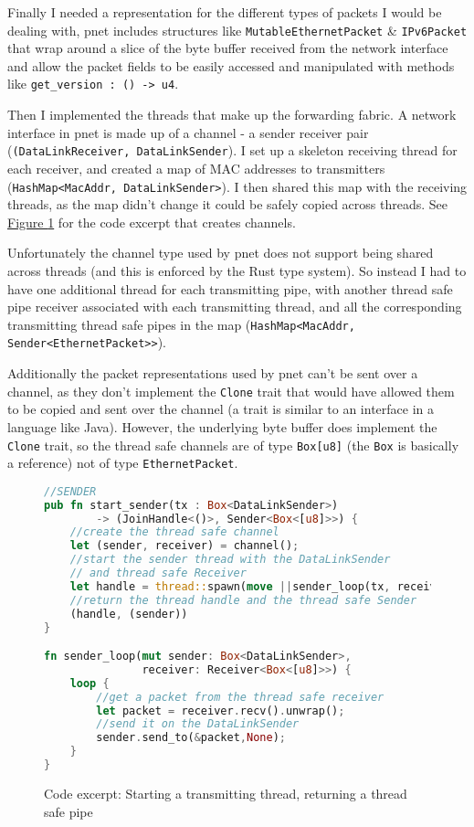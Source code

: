 \documentclass[12pt,a4paper,twoside,openany]{report}
\begin{document}
Finally I needed a representation for the different types of packets I would be dealing with, pnet\cite{4} includes structures like \verb!MutableEthernetPacket! \& \verb!IPv6Packet! that wrap around a slice of the byte buffer received from the network interface and allow the packet fields to be easily accessed and manipulated with methods like \verb!get_version : () -> u4!.

\bigskip

Then I implemented the threads that make up the forwarding fabric.  A network interface in pnet is made up of a channel - a sender receiver pair (\verb!(DataLinkReceiver, DataLinkSender!). I set up a skeleton receiving thread for each receiver, and created a map of MAC addresses to transmitters (\verb!HashMap<MacAddr, DataLinkSender>!).  I then shared this map with the receiving threads, as the map didn't change it could be safely copied across threads. See \hyperref[fig::sending]{Figure }\ref{fig::sending} for the code excerpt that creates channels.

Unfortunately the channel type used by pnet does not support being shared across threads (and this is enforced by the Rust type system).  So instead I had to have one additional thread for each transmitting pipe, with another thread safe pipe receiver associated with each transmitting thread, and all the corresponding transmitting thread safe pipes in the map (\verb!HashMap<MacAddr, Sender<EthernetPacket>>!).

Additionally the packet representations used by pnet can't be sent over a channel, as they don't implement the \verb!Clone! trait that would have allowed them to be copied and sent over the channel (a trait is similar to an interface in a language like Java).  However, the underlying byte buffer does implement the \verb!Clone! trait, so the thread safe channels are of type \verb!Box[u8]! (the \verb!Box! is basically a reference) not of type \verb!EthernetPacket!. 

\begin{figure}
\centering
\begin{varwidth}{\linewidth}
\begin{lstlisting}[language=Rust]
//SENDER
pub fn start_sender(tx : Box<DataLinkSender>) 
 		-> (JoinHandle<()>, Sender<Box<[u8]>>) {
    //create the thread safe channel
    let (sender, receiver) = channel();
    //start the sender thread with the DataLinkSender 
    // and thread safe Receiver
    let handle = thread::spawn(move ||sender_loop(tx, receiver));
    //return the thread handle and the thread safe Sender
    (handle, (sender))
}

fn sender_loop(mut sender: Box<DataLinkSender>, 
			   receiver: Receiver<Box<[u8]>>) {
    loop {
    	//get a packet from the thread safe receiver
        let packet = receiver.recv().unwrap();
        //send it on the DataLinkSender
        sender.send_to(&packet,None);
    }
}
\end{lstlisting}
\end{varwidth}
\caption{Code excerpt: Starting a transmitting thread, returning a thread safe pipe}
\label{fig::sending}
\end{figure}
\end{document}
